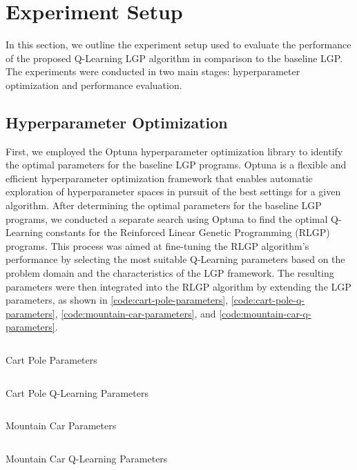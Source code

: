 \documentclass[12pt, final]{dalcsthesis}
\begin{document}
\section{Experiment Setup}

In this section, we outline the experiment setup used to evaluate the performance of the proposed Q-Learning LGP algorithm in comparison to the baseline LGP. The experiments were conducted in two main stages: hyperparameter optimization and performance evaluation.

\subsection{Hyperparameter Optimization}
First, we employed the Optuna hyperparameter optimization library \cite{akiba2019optuna} to identify the optimal parameters for the baseline LGP programs.
Optuna is a flexible and efficient hyperparameter optimization framework that enables automatic exploration of hyperparameter spaces in pursuit of the best settings for a given algorithm.
After determining the optimal parameters for the baseline LGP programs, we conducted a separate search using Optuna to find the optimal Q-Learning constants for the Reinforced Linear Genetic Programming (RLGP) programs.
This process was aimed at fine-tuning the RLGP algorithm's performance by selecting the most suitable Q-Learning parameters based on the problem domain and the characteristics of the LGP framework.
The resulting parameters were then integrated into the RLGP algorithm by extending the LGP parameters, as shown in \ref{code:cart-pole-parameters}, \ref{code:cart-pole-q-parameters}, \ref{code:mountain-car-parameters}, and \ref{code:mountain-car-q-parameters}.

\begin{listing}[!htb]
	\centering
	\inputminted[breaklines]{json}{../assets/parameters/cart-pole-lgp.json}
	\caption{Cart Pole Parameters}
	\label{code:cart-pole-parameters}
\end{listing}
\begin{listing}[!htb]
	\centering
	\inputminted[breaklines]{json}{../assets/parameters/cart-pole-q.json}
	\caption{Cart Pole Q-Learning Parameters}
	\label{code:cart-pole-q-parameters}
\end{listing}
\begin{listing}[!htb]
	\centering
	\inputminted[breaklines]{json}{../assets/parameters/mountain-car-lgp.json}
	\caption{Mountain Car Parameters}
	\label{code:mountain-car-parameters}
\end{listing}
\begin{listing}[!htb]
	\centering
	\inputminted[breaklines]{json}{../assets/parameters/mountain-car-q.json}
	\caption{Mountain Car Q-Learning Parameters}
	\label{code:mountain-car-q-parameters}
\end{listing}
\end{document}
